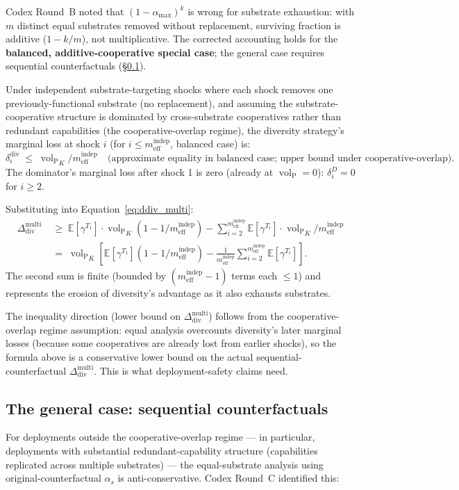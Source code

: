 \documentclass{article}
\DeclareMathOperator{\vol}{vol}
\newcommand{\volL}{{\vol_{\mathrm{P}}}}
\newcommand{\mindep}{m_{\mathrm{eff}}^{\mathrm{indep}}}
\newcommand{\Ddiv}{\Delta_{\mathrm{div}}}
\begin{document}
Codex Round~B noted that $(1 - \alpha_{\max})^k$ is wrong for
substrate exhaustion: with $m$ distinct equal substrates removed
without replacement, surviving fraction is additive ($1 - k/m$), not
multiplicative.  The corrected accounting holds for the
\textbf{balanced, additive-cooperative special case}; the general case
requires sequential counterfactuals (\S\ref{sec:sequential_counterfactual}).

Under independent substrate-targeting shocks where each shock removes
one previously-functional substrate (no replacement), and assuming
the substrate-cooperative structure is dominated by cross-substrate
cooperatives rather than redundant capabilities (the
cooperative-overlap regime), the diversity strategy's marginal loss
at shock $i$ (for $i \leq \mindep$, balanced case) is:
\[
  \delta_i^{\mathrm{div}} \;\leq\; \volL_K / \mindep
  \quad\text{(approximate equality in balanced case;
  upper bound under cooperative-overlap)}.
\]
The dominator's marginal loss after shock 1 is zero (already at
$\volL = 0$): $\delta_i^D = 0$ for $i \geq 2$.

Substituting into Equation~\ref{eq:ddiv_multi}:
\begin{align*}
\Ddiv^{\mathrm{multi}}
  &\;\geq\; \mathbb{E}[\gamma^{T_1}] \cdot \volL_K (1 - 1/\mindep)
   - \sum_{i=2}^{\mindep} \mathbb{E}[\gamma^{T_i}] \cdot \volL_K /
   \mindep \\
  &\;=\; \volL_K \left[\mathbb{E}[\gamma^{T_1}] (1 - 1/\mindep)
   - \frac{1}{\mindep} \sum_{i=2}^{\mindep} \mathbb{E}[\gamma^{T_i}]\right].
\end{align*}
The second sum is finite (bounded by $(\mindep - 1)$ terms each
$\leq 1$) and represents the erosion of diversity's advantage as it
also exhausts substrates.

The inequality direction (lower bound on $\Ddiv^{\mathrm{multi}}$)
follows from the cooperative-overlap regime assumption: equal
analysis overcounts diversity's later marginal losses (because some
cooperatives are already lost from earlier shocks), so the
formula above is a conservative lower bound on the actual
sequential-counterfactual $\Ddiv^{\mathrm{multi}}$.  This is what
deployment-safety claims need.

\subsection{The general case: sequential counterfactuals}
\label{sec:sequential_counterfactual}

For deployments outside the cooperative-overlap regime --- in
particular, deployments with substantial redundant-capability
structure (capabilities replicated across multiple substrates) ---
the equal-substrate analysis using original-counterfactual $\alpha_s$
is anti-conservative.  Codex Round~C identified this:
\end{document}
